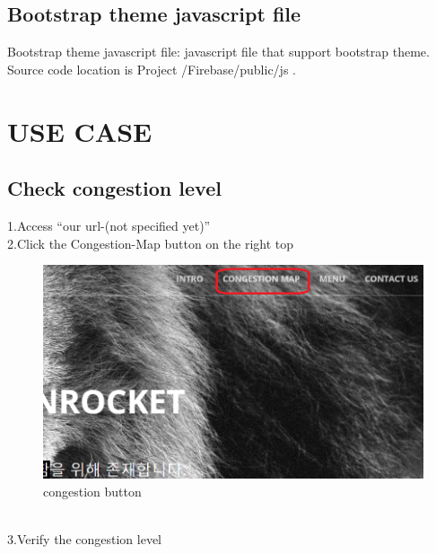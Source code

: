 \documentclass[journal]{IEEEtran}
\begin{document}
\subsection{Bootstrap theme javascript file}
Bootstrap theme javascript file: javascript file that support bootstrap theme.
Source code location is Project /Firebase/public/js .

\section{USE CASE}


\subsection{Check congestion level}
1.Access “our url-(not specified yet)” \\
2.Click the Congestion-Map button on the right top\\
\begin{figure}[h]
\centering
\includegraphics[scale=0.5]{congestion.png}
\caption{congestion button}
\label{fig:congestion button}
\end{figure}

\\3.Verify the congestion level
\end{document}
